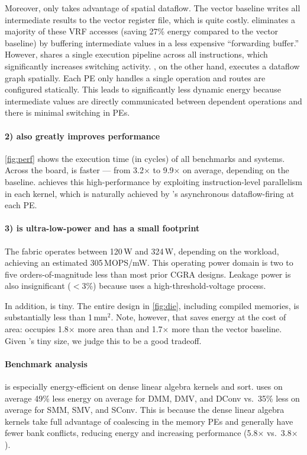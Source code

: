 Moreover, only \snafuarch takes advantage of spatial dataflow.
%
The vector baseline writes all intermediate results to the vector register file, which is quite costly.
% 
\manic eliminates a majority of these VRF accesses (saving 27\% energy compared to the vector baseline) by 
buffering intermediate values in a less expensive ``forwarding buffer.''
% 
However, \manic shares a single execution pipeline across all instructions,
% 
which significantly increases switching activity. 
% 
\snafuarch, on the other hand, executes a dataflow graph spatially.
% 
Each PE only handles a single operation and routes are configured statically.
% 
This leads to significantly less dynamic energy because intermediate values are directly communicated between dependent operations and there is minimal switching in PEs.

\paragraph{2) \snafuarch also greatly improves performance}
\autoref{fig:perf} shows the execution time (in cycles) of all benchmarks and systems.
% 
Across the board, \snafuarch is faster --- from 3.2$\times$ to 9.9$\times$ on average, depending on the baseline. 
% 
\snafuarch achieves this high-performance by exploiting instruction-level parallelism in each kernel,
%
which is naturally achieved by \snafuframe's asynchronous dataflow-firing at each PE.

\paragraph{3) \snafuarch is ultra-low-power and has a small footprint}
% 
The \snafuarch fabric operates between 120\,\textmu W and 324\,\textmu W, depending on the workload, achieving an estimated 305\,MOPS/mW.
% 
This operating power domain is two to five orders-of-magnitude less than most prior CGRA designs.
% 
Leakage power is also insignificant ($<$3\%) because \snafuarch uses a high-threshold-voltage process.
% 

In addition, \snafuarch is tiny.
The entire design in \autoref{fig:die}, including compiled memories, is substantially less than 1\,mm$^2$.
Note, however, that \snafuarch saves energy at the cost of area:
\snafuarch occupies 1.8$\times$ more area than \manic and 1.7$\times$ more than the vector baseline.
%
Given \snafuarch's tiny size, we judge this to be a good tradeoff.

\paragraph{Benchmark analysis}
\snafuarch is especially energy-efficient on dense linear algebra kernels and sort.
% 
\snafuarch uses on average 49\% less energy on average for DMM, DMV, and DConv vs.\ 35\% less on average for SMM, SMV, and SConv. 
% 
This is because the dense linear algebra kernels take full advantage of coalescing in the memory PEs and generally have fewer bank conflicts, reducing energy and increasing performance (5.8$\times$ vs.\ 3.8$\times$). 
 
